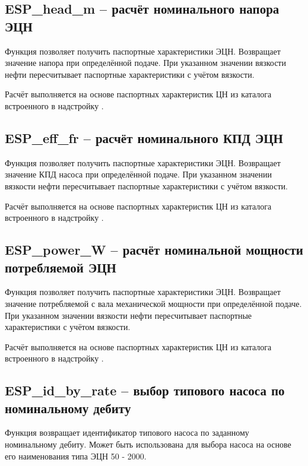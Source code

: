 \subsection{ESP\_head\_m – расчёт номинального напора ЭЦН}
Функция позволяет получить паспортные характеристики ЭЦН. Возвращает значение напора при определённой подаче. При указанном значении вязкости нефти пересчитывает паспортные характеристики с учётом вязкости.


Расчёт выполняется на основе паспортных характеристик ЦН из каталога встроенного в надстройку \unf{}. 

\subsection{ESP\_eff\_fr – расчёт номинального КПД ЭЦН}
Функция позволяет получить паспортные характеристики ЭЦН. Возвращает значение КПД насоса при определённой подаче. При указанном значении вязкости нефти пересчитывает паспортные характеристики с учётом вязкости.


Расчёт выполняется на основе паспортных характеристик ЦН из каталога встроенного в надстройку \unf{}. 

\subsection{ESP\_power\_W – расчёт номинальной мощности потребляемой ЭЦН}
Функция позволяет получить паспортные характеристики ЭЦН. Возвращает значение потребляемой с вала механической мощности при определённой подаче. При указанном значении вязкости нефти пересчитывает паспортные характеристики с учётом вязкости. 


Расчёт выполняется на основе паспортных характеристик ЦН из каталога встроенного в надстройку \unf{}. 

\subsection{ESP\_id\_by\_rate – выбор типового насоса по номинальному дебиту}
Функция возвращает идентификатор типового насоса по заданному номинальному дебиту. 
Может быть использована для выбора насоса на основе его наименования типа ЭЦН 50 - 2000.

